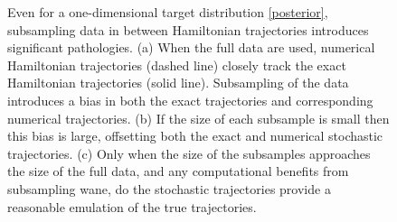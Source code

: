 \documentclass{article}
\begin{document}
\begin{figure}
\centering
{}
\caption{Even for a one-dimensional target distribution \eqref{posterior}, subsampling
data in between Hamiltonian trajectories introduces significant pathologies.
(a) When the full data are used, numerical Hamiltonian trajectories (dashed line) 
closely track the exact Hamiltonian trajectories (solid line).  Subsampling of the
data introduces a bias in both the exact trajectories and corresponding
numerical trajectories.  (b) If the size of each subsample is small then this bias 
is large, offsetting both the exact and numerical stochastic trajectories. 
(c) Only when the size of the subsamples approaches the size of the full data, 
and any computational benefits from subsampling wane, do the stochastic 
trajectories provide a reasonable emulation of the true trajectories.}
\label{fig:level_sets}
\end{figure}
\end{document}
